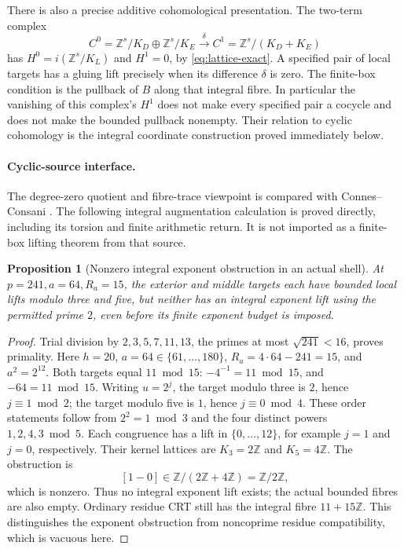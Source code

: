 \documentclass[11pt]{article}
\newtheorem{proposition}[theorem]{Proposition}
\theoremstyle{definition}\newtheorem{definition}[theorem]{Definition}
\theoremstyle{remark}\newtheorem{remark}[theorem]{Remark}
\newcommand{\Z}{\mathbb Z}\newcommand{\Q}{\mathbb Q}
\begin{document}
There is also a precise additive cohomological presentation.
The two-term complex
\[
 C^0=\Z^s/K_D\oplus\Z^s/K_E
       \xrightarrow{\delta}
 C^1=\Z^s/(K_D+K_E)
\]
has \(H^0=i(\Z^s/K_L)\) and \(H^1=0\), by
\eqref{eq:lattice-exact}.  A specified pair of local targets has
a gluing lift precisely when its difference \(\delta\) is zero.
The finite-box condition is the pullback of \(B\) along that
integral fibre.  In particular the vanishing of this complex's
\(H^1\) does not make every specified pair a cocycle and does not
make the bounded pullback nonempty. Their relation to cyclic
cohomology is the integral coordinate construction proved immediately below.

\paragraph{Cyclic-source interface.}
The degree-zero quotient and fibre-trace viewpoint is compared with
Connes--Consani \cite[Proposition 3.1 and equation (3.2)]{CCTrace}.
The following integral augmentation calculation is proved directly, including
its torsion and finite arithmetic return. It is not imported as a finite-box
lifting theorem from that source.


\begin{proposition}[Nonzero integral exponent obstruction in an actual shell]
\label{prop:nonzero-obstruction}
At \(p=241,a=64,R_a=15\), the exterior and middle targets each
have bounded local lifts modulo three and five, but neither
has an integral exponent lift using the permitted prime \(2\),
even before its finite exponent budget is imposed.
\end{proposition}
\begin{proof}
Trial division by \(2,3,5,7,11,13\), the primes at most
\(\sqrt{241}<16\), proves primality.  Here \(h=20\),
\(a=64\in\{61,\ldots,180\}\), \(R_a=4\cdot64-241=15\),
and \(a^2=2^{12}\).  Both targets equal \(11\bmod15\):
\(-4^{-1}=11\bmod15\), and \(-64=11\bmod15\).
Writing \(u=2^j\), the target modulo three is \(2\), hence
\(j\equiv1\bmod2\); the target modulo five is \(1\), hence
\(j\equiv0\bmod4\).  These order statements follow from
\(2^2=1\bmod3\) and the four distinct powers
\(1,2,4,3\bmod5\).
Each congruence has a lift in \(\{0,\ldots,12\}\),
for example \(j=1\) and \(j=0\), respectively.  Their
kernel lattices are \(K_3=2\Z\) and \(K_5=4\Z\).
The obstruction is
\[
 [1-0]\in\Z/(2\Z+4\Z)=\Z/2\Z,
\]
which is nonzero.  Thus no integral exponent lift exists;
the actual bounded fibres are also empty.  Ordinary
residue CRT still has the integral fibre \(11+15\Z\).
This distinguishes the exponent obstruction from
noncoprime residue compatibility, which is vacuous here.
\end{proof}
\end{document}
